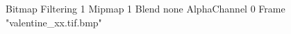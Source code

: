 {Bitmap
	{Filtering 1}
	{Mipmap 1}
	{Blend none}
	{AlphaChannel 0}
	{Frame "valentine_xx.tif.bmp"}
}
